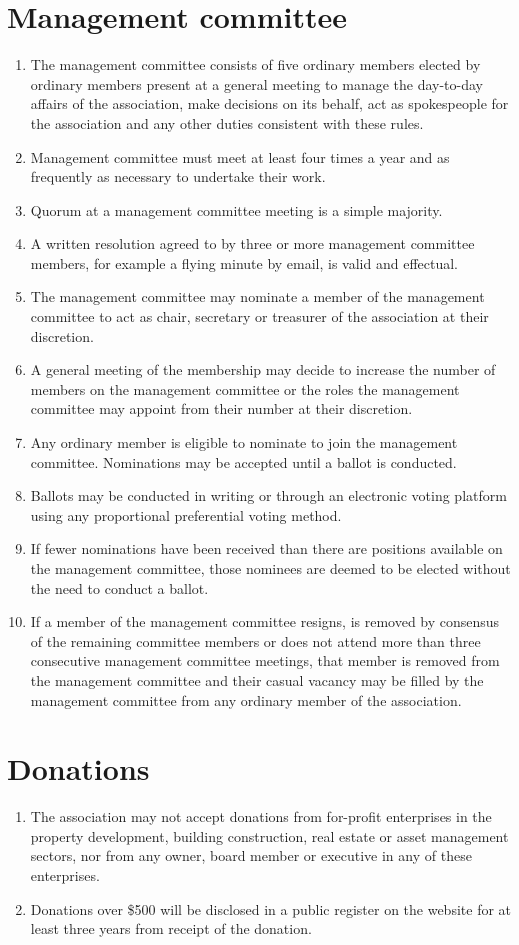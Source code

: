 \documentclass[11pt, oneside]{article}
\begin{document}
\section{Management committee}
\begin{enumerate}

\item The management committee consists of five ordinary members elected by ordinary members present at a general meeting to manage the day-to-day affairs of the association, make decisions on its behalf, act as spokespeople for the association and any other duties consistent with these rules. 
\item Management committee must meet at least four times a year and as frequently as necessary to undertake their work.
\item Quorum at a management committee meeting is a simple majority. 
\item A written resolution agreed to by three or more management committee members, for example a flying minute by email, is valid and effectual. 
\item The management committee may nominate a member of the management committee to act as chair, secretary or treasurer of the association at their discretion. 
\item A general meeting of the membership may decide to increase the number of members on the management committee or the roles the management committee may appoint from their number at their discretion. 
\item Any ordinary member is eligible to nominate to join the management committee. Nominations may be accepted until a ballot is conducted. 
\item Ballots may be conducted in writing or through an electronic voting platform using any proportional preferential voting method. 
\item If fewer nominations have been received than there are positions available on the management committee, those nominees are deemed to be elected without the need to conduct a ballot. 
\item If a member of the management committee resigns, is removed by consensus of the remaining committee members or does not attend more than three consecutive management committee meetings, that member is removed from the management committee and their casual vacancy may be filled by the management committee from any ordinary member of the association.
\end{enumerate}
\section{Donations}
\begin{enumerate}
\item The association may not accept donations from for-profit enterprises in the property development, building construction, real estate or asset management sectors, nor from any owner, board member or executive in any of these enterprises. 
\item Donations over \$500 will be disclosed in a public register on the website for at least three years from receipt of the donation. 
\end{enumerate}
\end{document}
